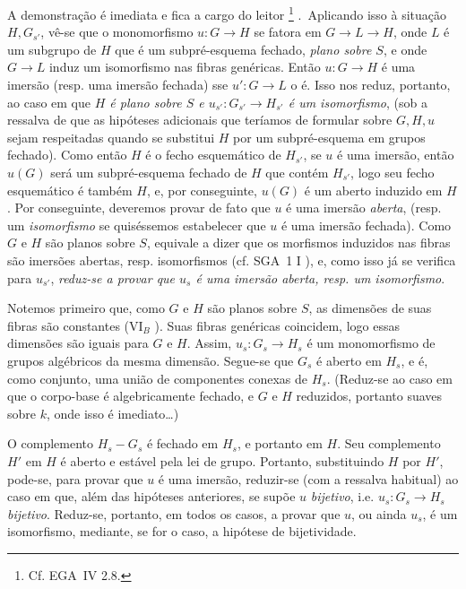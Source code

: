 A demonstração é imediata e fica a cargo do leitor\begingroup
\renewcommand{\thefootnote}{(\(\ast\))}%
\footnote[0]{Cf. EGA~IV 2.8.}%
\endgroup.\ Aplicando isso à situação \(H,G_{s'}\), vê-se que o monomorfismo
\(u:G\to H\) se fatora em \(G\to L\to H\), onde \(L\) é um
subgrupo de \(H\) que é um subpré-esquema fechado, \emph{plano sobre
\(S\)}, e onde \(G\to L\) induz um isomorfismo nas fibras genéricas.
Então \(u:G\to H\) é uma imersão (resp. uma imersão fechada) sse
\(u':G\to L\) o é. Isso nos reduz, portanto, ao caso em que
\emph{\(H\) é plano sobre \(S\) e \(u_{s'}:G_{s'}\to H_{s'}\) é um
isomorfismo}, (sob a ressalva de que as hipóteses adicionais que
teríamos de formular sobre \(G,H,u\) sejam respeitadas quando se
substitui \(H\) por um subpré-esquema em grupos fechado). Como então
\(H\) é o fecho esquemático de \(H_{s'}\), se \(u\) é uma imersão,
então \(u(G)\) será um subpré-esquema fechado de \(H\) que contém
\(H_{s'}\), logo seu fecho esquemático é também \(H\), e, por
conseguinte, \(u(G)\) é um aberto induzido em \(H\). Por conseguinte,
deveremos provar de fato que \(u\) é uma imersão \emph{aberta},
(resp. um \emph{isomorfismo} se quiséssemos estabelecer que \(u\)
é uma imersão fechada). Como \(G\) e \(H\) são planos sobre \(S\),
equivale a dizer que os morfismos induzidos nas fibras são imersões
abertas, resp. isomorfismos (cf. SGA~1 I
), e, como isso já se verifica para
\(u_{s'}\), \emph{reduz-se a provar que \(u_s\) é uma imersão
aberta, resp. um isomorfismo}.

Notemos primeiro que, como \(G\) e \(H\) são planos sobre \(S\), as
dimensões de suas fibras são constantes (VI\(_B\)
). Suas fibras genéricas coincidem,
logo essas dimensões são iguais para \(G\) e \(H\). Assim,
\(u_s:G_s\to H_s\) é um monomorfismo de grupos algébricos da mesma
dimensão. Segue-se que \(G_s\) é aberto em \(H_s\), e é, como conjunto,
uma união de componentes conexas de \(H_s\). (Reduz-se ao caso em que o corpo-base é algebricamente fechado, e
\(G\) e \(H\) reduzidos, portanto suaves sobre \(k\), onde isso é
imediato\ldots)

O complemento \(H_s-G_s\) é fechado em \(H_s\), e portanto em \(H\).
Seu complemento \(H'\) em \(H\) é aberto e estável pela lei de grupo.
Portanto, substituindo \(H\) por \(H'\), pode-se, para provar que
\(u\) é uma imersão, reduzir-se (com a ressalva habitual) ao caso em
que, além das hipóteses anteriores, se supõe \(u\) \emph{bijetivo},
i.e. \(u_s:G_s\to H_s\) \emph{bijetivo}. Reduz-se, portanto, em
todos os casos, a provar que \(u\), ou ainda \(u_s\), é um
isomorfismo, mediante, se for o caso, a hipótese de bijetividade.

